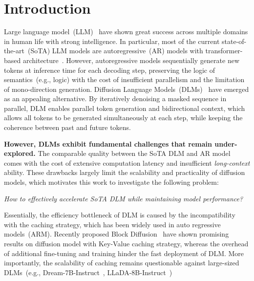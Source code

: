\section{Introduction}
Large language model~(LLM)~\cite{liu2024deepseek, bai2023qwen, touvron2023llama} have shown great success across multiple domains in human life with strong intelligence. In particular, most of the current state-of-the-art~(SoTA) LLM models are autoregressive~(AR) models with transformer-based architecture~\cite{vaswani2017attention}. However, autoregressive models sequentially generate new tokens at inference time for each decoding step, preserving the logic of semantics~(e.g., logic) with the cost of insufficient parallelism and the limitation of mono-direction generation. 
Diffusion Language Models~(DLMs)~\cite{dream2025, nie2025large, arriola2025block} have emerged as an appealing alternative. 
By iteratively denoising a masked sequence in parallel, DLM enables parallel token generation and bidirectional context, which allows all tokens to be generated simultaneously at each step, while keeping the coherence between past and future tokens. 

\textbf{However, DLMs exhibit fundamental challenges that remain under-explored.}
The comparable quality between the SoTA DLM and AR model comes with the cost of extensive computation latency and insufficient \textit{long-context} ability. 
These drawbacks largely limit the scalability and practicality of diffusion models, which motivates this work to investigate the following problem:

\begin{center}
\textit{How to effectively accelerate SoTA DLM while maintaining model performance?}
\end{center}

Essentially, the efficiency bottleneck of DLM is caused by the incompatibility with the caching strategy, which has been widely used in auto regressive models~(ARM).
Recently proposed Block Diffusion~\cite{arriola2025block} have shown promising results on diffusion model with Key-Value caching strategy, whereas the overhead of additional fine-tuning and training hinder the fast deployment of DLM. More importantly, the scalability of caching remains questionable against large-sized DLMs~(e.g., Dream-7B-Instruct~\cite{dream2025}, LLaDA-8B-Instruct~\cite{nie2025large})

